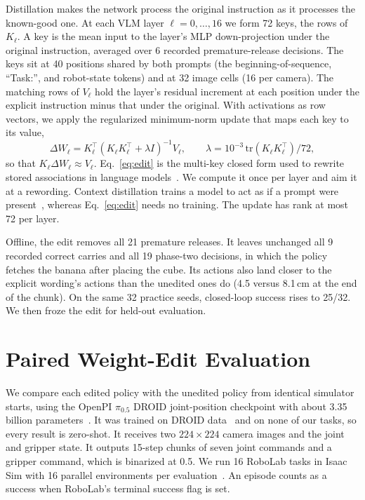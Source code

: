 \documentclass{article}
\newcommand{\pifive}{$\pi_{0.5}$}
\begin{document}
Distillation makes the network process the original instruction as it processes the known-good one. At each VLM layer $\ell=0,\dots,16$ we form 72 keys, the rows of $K_\ell$. A key is the mean input to the layer's MLP down-projection under the original instruction, averaged over 6 recorded premature-release decisions. The keys sit at 40 positions shared by both prompts (the beginning-of-sequence, ``Task:'', and robot-state tokens) and at 32 image cells (16 per camera). The matching rows of $V_\ell$ hold the layer's residual increment at each position under the explicit instruction minus that under the original. With activations as row vectors, we apply the regularized minimum-norm update that maps each key to its value,
\begin{equation}
\Delta W_\ell = K_\ell^{\top}\left(K_\ell K_\ell^{\top} + \lambda I\right)^{-1} V_\ell,\qquad \lambda = 10^{-3}\,\mathrm{tr}\!\left(K_\ell K_\ell^{\top}\right)/72,
\label{eq:edit}
\end{equation}
so that $K_\ell \Delta W_\ell \approx V_\ell$. Eq.~\eqref{eq:edit} is the multi-key closed form used to rewrite stored associations in language models~\citep{meng2022rome,meng2023memit}. We compute it once per layer and aim it at a rewording. Context distillation trains a model to act as if a prompt were present~\citep{snell2022distilling}, whereas Eq.~\eqref{eq:edit} needs no training. The update has rank at most 72 per layer.

Offline, the edit removes all 21 premature releases. It leaves unchanged all 9 recorded correct carries and all 19 phase-two decisions, in which the policy fetches the banana after placing the cube. Its actions also land closer to the explicit wording's actions than the unedited ones do (4.5 versus 8.1\,cm at the end of the chunk). On the same 32 practice seeds, closed-loop success rises to 25/32. We then froze the edit for held-out evaluation.

\section{Paired Weight-Edit Evaluation}
\label{sec:eval}
We compare each edited policy with the unedited policy from identical simulator starts, using the OpenPI \pifive{} DROID joint-position checkpoint with about 3.35 billion parameters~\citep{openpi2025,pi2025pi05}. It was trained on DROID data~\citep{khazatsky2024droid} and on none of our tasks, so every result is zero-shot. It receives two $224\times224$ camera images and the joint and gripper state. It outputs 15-step chunks of seven joint commands and a gripper command, which is binarized at 0.5. We run 16 RoboLab tasks in Isaac Sim with 16 parallel environments per evaluation~\citep{yang2026robolab}. An episode counts as a success when RoboLab's terminal success flag is set.
\end{document}
